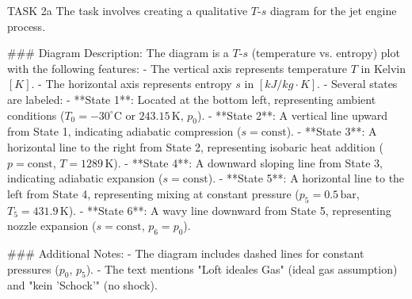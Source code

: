 TASK 2a  
The task involves creating a qualitative \( T \)-\( s \) diagram for the jet engine process.  

### Diagram Description:  
The diagram is a \( T \)-\( s \) (temperature vs. entropy) plot with the following features:  
- The vertical axis represents temperature \( T \) in Kelvin \([K]\).  
- The horizontal axis represents entropy \( s \) in \([kJ/kg·K]\).  
- Several states are labeled:  
  - **State 1**: Located at the bottom left, representing ambient conditions (\( T_0 = -30^\circ\text{C} \) or \( 243.15 \, \text{K} \), \( p_0 \)).  
  - **State 2**: A vertical line upward from State 1, indicating adiabatic compression (\( s = \text{const} \)).  
  - **State 3**: A horizontal line to the right from State 2, representing isobaric heat addition (\( p = \text{const} \), \( T = 1289 \, \text{K} \)).  
  - **State 4**: A downward sloping line from State 3, indicating adiabatic expansion (\( s = \text{const} \)).  
  - **State 5**: A horizontal line to the left from State 4, representing mixing at constant pressure (\( p_5 = 0.5 \, \text{bar} \), \( T_5 = 431.9 \, \text{K} \)).  
  - **State 6**: A wavy line downward from State 5, representing nozzle expansion (\( s = \text{const} \), \( p_6 = p_0 \)).  

### Additional Notes:  
- The diagram includes dashed lines for constant pressures (\( p_0 \), \( p_5 \)).  
- The text mentions "Loft ideales Gas" (ideal gas assumption) and "kein 'Schock'" (no shock).  

